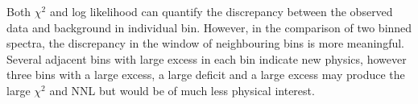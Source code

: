 

Both $\chi^{2}$ and log likelihood can quantify the discrepancy between the observed data and background in individual bin.
However, in the comparison of two binned spectra, the discrepancy in the window of neighbouring bins is more meaningful.
Several adjacent bins with large excess in each bin indicate new physics, however three bins with a large excess, a large deficit and a large excess may produce the large $\chi^{2}$ and NNL but would be of much less physical interest.

